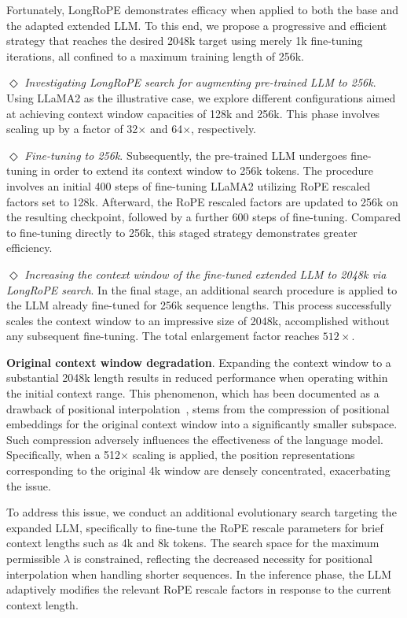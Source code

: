 Fortunately, LongRoPE demonstrates efficacy when applied to both the base and the adapted extended LLM. To this end, we propose a progressive and efficient strategy that reaches the desired 2048k target using merely 1k fine-tuning iterations, all confined to a maximum training length of 256k.

$\Diamond$ \textit{Investigating LongRoPE search for augmenting pre-trained LLM to 256k}. Using LLaMA2 as the illustrative case, we explore different configurations aimed at achieving context window capacities of 128k and 256k. This phase involves scaling up by a factor of 32$\times$ and 64$\times$, respectively.

$\Diamond$ \textit{Fine-tuning to 256k}. Subsequently, the pre-trained LLM undergoes fine-tuning in order to extend its context window to 256k tokens. The procedure involves an initial 400 steps of fine-tuning LLaMA2 utilizing RoPE rescaled factors set to 128k. Afterward, the RoPE rescaled factors are updated to 256k on the resulting checkpoint, followed by a further 600 steps of fine-tuning. Compared to fine-tuning directly to 256k, this staged strategy demonstrates greater efficiency.

$\Diamond$ \textit{Increasing the context window of the fine-tuned extended LLM to 2048k via LongRoPE search}. In the final stage, an additional search procedure is applied to the LLM already fine-tuned for 256k sequence lengths. This process successfully scales the context window to an impressive size of 2048k, accomplished without any subsequent fine-tuning. The total enlargement factor reaches $512\times$.

\textbf{Original context window degradation}.  Expanding the context window to a substantial 2048k length results in reduced performance when operating within the initial context range. This phenomenon, which has been documented as a drawback of positional interpolation~\cite{pi}, stems from the compression of positional embeddings for the original context window into a significantly smaller subspace. Such compression adversely influences the effectiveness of the language model. Specifically, when a 512$\times$ scaling is applied, the position representations corresponding to the original 4k window are densely concentrated, exacerbating the issue.

To address this issue, we conduct an additional evolutionary search targeting the expanded LLM, specifically to fine-tune the RoPE rescale parameters for brief context lengths such as 4k and 8k tokens. The search space for the maximum permissible $\lambda$ is constrained, reflecting the decreased necessity for positional interpolation when handling shorter sequences. In the inference phase, the LLM adaptively modifies the relevant RoPE rescale factors in response to the current context length.

